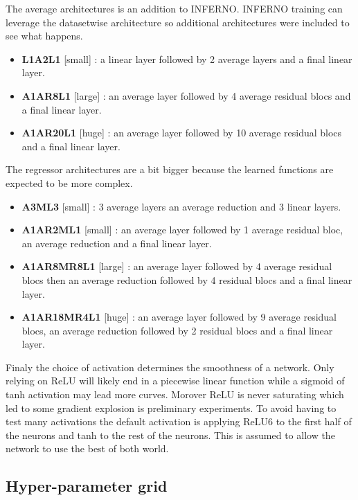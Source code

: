 The average architectures is an addition to INFERNO.
INFERNO training can leverage the datasetwise architecture so additional architectures were included to see what happens.
\begin{itemize}
	\item \textbf{L1A2L1} [small] : a linear layer followed by 2 average layers and a final linear layer.
	\item \textbf{A1AR8L1} [large] : an average layer followed by 4 average residual blocs and a final linear layer.
	\item \textbf{A1AR20L1} [huge] : an average layer followed by 10 average residual blocs and a final linear layer.
\end{itemize}

The regressor architectures are a bit bigger because the learned functions are expected to be more complex.
\begin{itemize}
	\item \textbf{A3ML3} [small] : 3 average layers an average reduction and 3 linear layers.
	\item \textbf{A1AR2ML1} [small] : an average layer followed by 1 average residual bloc, an average reduction and a final linear layer.
	\item \textbf{A1AR8MR8L1} [large] : an average layer followed by 4 average residual blocs then an average reduction followed by 4 residual blocs and a final linear layer.
	\item \textbf{A1AR18MR4L1} [huge] : an average layer followed by 9 average residual blocs, an average reduction followed by 2 residual blocs and a final linear layer.
\end{itemize}

Finaly the choice of activation determines the smoothness of a network.
Only relying on ReLU will likely end in a piecewise linear function while a sigmoid of tanh activation may lead more curves.
Morover ReLU is never saturating which led to some gradient explosion is preliminary experiments. 
To avoid having to test many activations the default activation is applying ReLU6 to the first half of the neurons and tanh to the rest of the neurons.
This is assumed to allow the network to use the best of both world.






\subsection{Hyper-parameter grid} %
\label{sub:hyper_parameter_grid}

